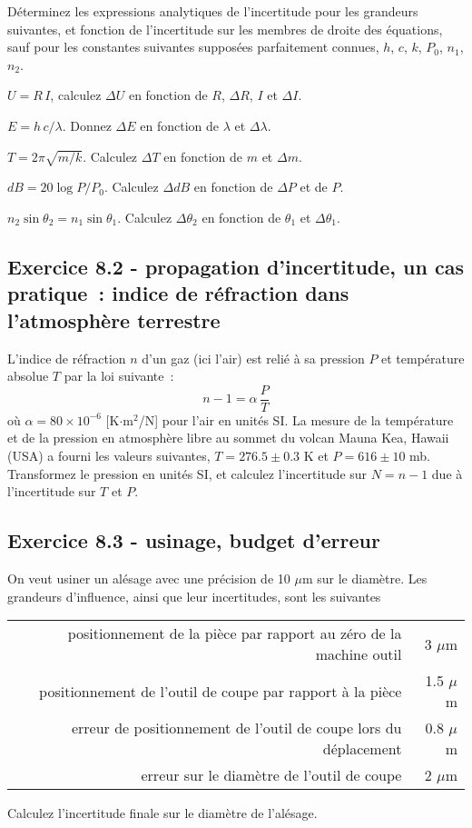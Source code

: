 Déterminez les expressions analytiques de l'incertitude pour les grandeurs suivantes, et fonction de l'incertitude sur les membres de droite des équations, sauf pour les constantes suivantes supposées parfaitement connues, $h$, $c$, $k$, $P_0$, $n_1$, $n_2$.
\begin{description}\renewcommand{\labelitemi}{$\bullet$}
\item[loi d'Ohm] $U=R\,I$, calculez $\Delta U$ en fonction de $R$, $\Delta R$, $I$ et $\Delta I$.
\item[Energie du photon] $E=h\,c/\lambda$. Donnez $\Delta E$ en fonction de $\lambda$ et $\Delta\lambda$.
\item[Période d'oscillation masse et ressort] $T=2\pi\sqrt{m/k}$. Calculez $\Delta T$ en fonction de $m$ et $\Delta m$.
\item[Décibels et puissance] $dB=20\log{P/P_0}$. Calculez $\Delta dB$ en fonction de $\Delta P$ et de $P$.
\item[Loi de Snell (optique)] $n_2\sin{\theta_2}=n_1\sin{\theta_1}$. Calculez $\Delta\theta_2$ en fonction de $\theta_1$ et $\Delta\theta_1$.
\end{description}

\subsection*{Exercice 8.2 - propagation d'incertitude, un cas pratique~: indice de réfraction dans l'atmosphère terrestre}

L'indice de réfraction $n$ d'un gaz (ici l'air) est relié à sa pression $P$ et température absolue $T$ par la loi suivante~:
$$
n-1=\alpha\,\frac{P}{T}
$$
où $\alpha=80\times10^{-6}$ [K$\cdot$m$^2$/N] pour l'air en unités SI. La mesure de la température et de la pression en atmosphère libre au sommet du volcan Mauna Kea, Hawaii (USA) a fourni les valeurs suivantes, $T=276.5\pm0.3$ K et $P=616\pm10$ mb. Transformez le pression en unités SI, et calculez l'incertitude sur $N=n-1$ due à l'incertitude sur $T$ et $P$.

\subsection*{Exercice 8.3 - usinage, budget d'erreur}

On veut usiner un alésage avec une précision de 10 $\mu$m sur le diamètre. Les grandeurs d'influence, ainsi que leur incertitudes, sont les suivantes
\begin{center}
\begin{tabular}{r|r}
positionnement de la pièce par rapport au zéro de la machine outil & 3 $\mu$m \\
positionnement de l'outil de coupe par rapport à la pièce & 1.5 $\mu$m \\
erreur de positionnement de l'outil de coupe lors du déplacement & 0.8 $\mu$m \\
erreur sur le diamètre de l'outil de coupe & 2 $\mu$m
\end{tabular}
\end{center}
Calculez l'incertitude finale sur le diamètre de l'alésage.

